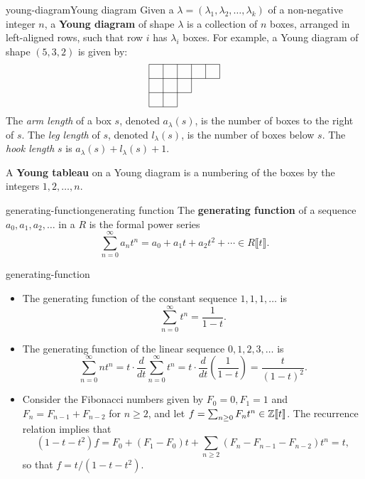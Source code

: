 \begin{topic}{young-diagram}{Young diagram}
    Given a  $\lambda = (\lambda_1, \lambda_2, \ldots, \lambda_k)$ of a non-negative integer $n$, a \textbf{Young diagram} of shape $\lambda$ is a collection of $n$ boxes, arranged in left-aligned rows, such that row $i$ has $\lambda_i$ boxes. For example, a Young diagram of shape $(5, 3, 2)$ is given by:
    \[ \begin{tikzpicture}
        \begin{scope}[scale=0.5]
            \draw (0, 3) -- (5, 3); \draw (0, 2) -- (5, 2); \draw (0, 1) -- (3, 1); \draw (0, 0) -- (2, 0); \draw (0, 3) -- (0, 0); \draw (1, 3) -- (1, 0); \draw (2, 3) -- (2, 0); \draw (3, 3) -- (3, 1); \draw (4, 3) -- (4, 2); \draw (5, 3) -- (5, 2);
        \end{scope}
    \end{tikzpicture} \]
    The \textit{arm length} of a box $s$, denoted $a_\lambda(s)$, is the number of boxes to the right of $s$. The \textit{leg length} of $s$, denoted $l_\lambda(s)$, is the number of boxes below $s$. The \textit{hook length} $s$ is $a_\lambda(s) + l_\lambda(s) + 1$.
    
    A \textbf{Young tableau} on a Young diagram is a numbering of the boxes by the integers $1, 2, \ldots, n$.
\end{topic}

\begin{topic}{generating-function}{generating function}
    The \textbf{generating function} of a sequence $a_0, a_1, a_2, \ldots$ in a  $R$ is the formal power series
    \[ \sum_{n = 0}^{\infty} a_n t^n = a_0 + a_1 t + a_2 t^2 + \cdots \in R \llbracket t \rrbracket . \]
\end{topic}

\begin{example}{generating-function}
    \begin{itemize}
        \item The generating function of the constant sequence $1, 1, 1, \ldots$ is
        \[ \sum_{n = 0}^{\infty} t^n = \frac{1}{1 - t} . \]
        \item The generating function of the linear sequence $0, 1, 2, 3, \ldots$ is
        \[ \sum_{n = 0}^{\infty} n t^{n} = t \cdot \frac{d}{dt} \sum_{n = 0}^{\infty} t^{n} = t \cdot \frac{d}{dt} \left( \frac{1}{1 - t} \right) = \frac{t}{(1 - t)^2} . \]
        \item Consider the Fibonacci numbers given by $F_0 = 0, F_1 = 1$ and $F_n = F_{n - 1} + F_{n - 2}$ for $n \ge 2$, and let $f = \sum_{n \ge 0} F_n t^n \in \mathbb{Z} \llbracket t \rrbracket$. The recurrence relation implies that
        \[ (1 - t - t^2) f = F_0 + (F_1 - F_0) t + \sum_{n \ge 2} (F_n - F_{n - 1} - F_{n - 2}) t^n = t , \]
        so that $f = t / (1 - t - t^2)$.
    \end{itemize}
\end{example}

